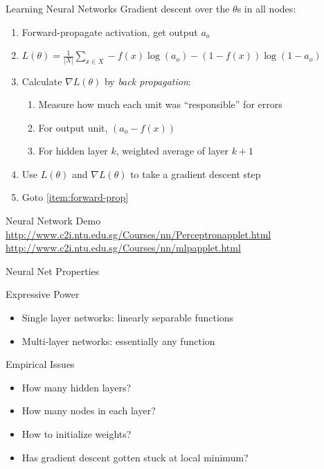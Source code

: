 \documentclass[14pt]{beamer}
\begin{document}
\begin{frame}[label=nn-learning]{Learning Neural Networks}
Gradient descent over the $\theta$s in all nodes:
\begin{enumerate}
\item\label{item:forward-prop} Forward-propagate activation, get output $a_o$
\item $\displaystyle L(\theta) = \frac{1}{|X|} \sum_{x \in X} -f(x) \log(a_o) - (1 - f(x)) \log(1 - a_o)$
\item Calculate $\displaystyle \nabla L(\theta)$ by \textit{back propagation}:
\begin{enumerate}
\item Measure how much each unit was ``responsible'' for errors
\item For output unit, $(a_o - f(x))$
\item For hidden layer $k$, weighted average of layer $k+1$
\end{enumerate}
\item Use $L(\theta)$ and $\nabla L(\theta)$ to take a gradient descent step
\item Goto \ref{item:forward-prop}
\end{enumerate}
\end{frame}

\begin{frame}[label=nn-demo]{Neural Network Demo}
\url{http://www.c2i.ntu.edu.sg/Courses/nn/Perceptronapplet.html}
\\ \bigskip
\url{http://www.c2i.ntu.edu.sg/Courses/nn/mlpapplet.html}
\end{frame}

\begin{frame}[label=nn-properties]{Neural Net Properties}
\begin{block}{Expressive Power}
\begin{itemize}
\item Single layer networks: linearly separable functions
\item Multi-layer networks: essentially any function
\end{itemize}
\end{block}
\pause
\begin{block}{Empirical Issues}
\begin{itemize}
\item How many hidden layers?
\item How many nodes in each layer?
\item How to initialize weights?
\item Has gradient descent gotten stuck at local minimum?
\end{itemize}
\end{block}
\end{frame}
\end{document}
